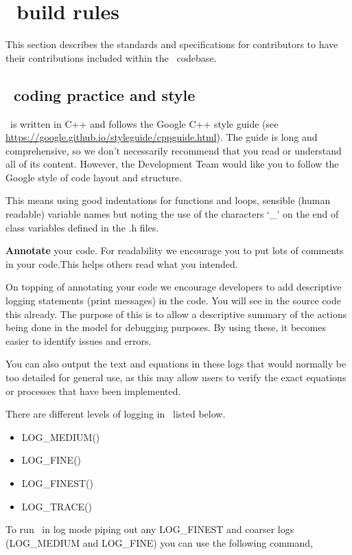 \section{\CNAME\ build rules\label{sec:build_rules}}

This section describes the standards and specifications for contributors to have their contributions included within the \CNAME\ codebase. 

\subsection{\CNAME\ coding practice and style}

\CNAME\ is written in C++ and follows the Google C++ style guide (see \url{https://google.github.io/styleguide/cppguide.html}). The guide is long and comprehensive, so we don't necessarily recommend that you read or understand all of its content. However, the Development Team would like you to follow the Google style of code layout and structure. 

This means using good indentations for functions and loops, sensible (human readable) variable names but noting the use of the characters `\_' on the end of class variables defined in the .h files. 

\textbf{Annotate} your code. For readability we encourage you to put lots of comments in your code.This helps others read what you intended. 

On topping of annotating your code we encourage developers to add descriptive logging statements (print messages) in the code. You will see in the source code this already. The purpose of this is to allow a descriptive summary of the actions being done in the model for debugging purposes. By using these, it becomes easier to identify issues and errors. 

You can also output the text and equations in these logs that would normally be too detailed for general use, as this may allow users to verify the exact equations or processes that have been implemented.

There are different levels of logging in \CNAME\ listed below.
\begin{itemize}
	\item LOG\_MEDIUM() 
	\item LOG\_FINE() 
	\item LOG\_FINEST() 
	\item LOG\_TRACE() 
\end{itemize}

To run \CNAME\ in log mode piping out any LOG\_FINEST and coarser logs (LOG\_MEDIUM and LOG\_FINE) you can use the following command,

